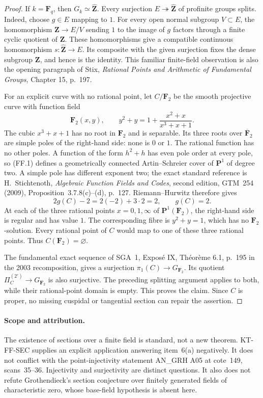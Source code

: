 \begin{proof}
If $k=\mathbf F_q$, then $G_k\simeq\widehat{\mathbf Z}$.
Every surjection $E\twoheadrightarrow\widehat{\mathbf Z}$ of
profinite groups splits. Indeed, choose $g\in E$ mapping to $1$.
For every open normal subgroup $V\subset E$, the homomorphism
$\mathbf Z\to E/V$ sending $1$ to the image of $g$ factors through
a finite cyclic quotient of $\mathbf Z$. These homomorphisms give
a compatible continuous homomorphism
$s:\widehat{\mathbf Z}\to E$. Its composite with the given
surjection fixes the dense subgroup $\mathbf Z$, and hence is the
identity. This familiar finite-field observation is also the opening
paragraph of Stix, \emph{Rational Points and Arithmetic of Fundamental
Groups}, Chapter 15, p.~197.

For an explicit curve with no rational point, let $C/\mathbf F_2$
be the smooth projective curve with function field
\[
 \mathbf F_2(x,y),\qquad
 y^2+y=1+\frac{x^2+x}{x^3+x+1}.                         \tag{FF.1}
\]
The cubic $x^3+x+1$ has no root in $\mathbf F_2$ and is separable.
Its three roots over $\overline{\mathbf F}_2$ are simple poles of
the right-hand side: none is $0$ or $1$. The rational function has
no other poles. A function of the form $h^2+h$ has even pole order
at every pole, so (FF.1) defines a geometrically connected
Artin--Schreier cover of $\mathbf P^1$ of degree two. A simple pole
has different exponent two; the exact standard reference is
H.~Stichtenoth, \emph{Algebraic Function Fields and Codes}, second
edition, GTM~254 (2009), Proposition~3.7.8(c)--(d), p.~127.
Riemann--Hurwitz therefore gives
\[
 2g(C)-2=2(-2)+3\cdot2=2,
 \qquad g(C)=2.
\]
At each of the three rational points $x=0,1,\infty$ of
$\mathbf P^1(\mathbf F_2)$, the right-hand side is regular and
has value $1$. The corresponding fibre is
$y^2+y=1$, which has no $\mathbf F_2$-solution. Every rational
point of $C$ would map to one of these three rational points.
Thus $C(\mathbf F_2)=\varnothing$.

The fundamental exact sequence of SGA~1, Expos\'e IX,
Th\'eor\`eme 6.1, p.~195 in the 2003 recomposition, gives a
surjection $\pi_1(C)\to G_{\mathbf F_2}$. Its quotient
$\Pi_C^{(2')}\to G_{\mathbf F_2}$ is also surjective. The
preceding splitting argument applies to both, while their
rational-point domain is empty. This proves the claim. Since
$C$ is proper, no missing cuspidal or tangential section can
repair the assertion.
\end{proof}

\paragraph{Scope and attribution.}
The existence of sections over a finite field is standard, not a
new theorem. KT-FF-SEC supplies an explicit application answering
item~6(a) negatively. It does not conflict with the point-injectivity
statement AN\_GRH A05 at cote~149, scans~35--36. Injectivity and
surjectivity are distinct questions. It also does not refute
Grothendieck's section conjecture over finitely generated fields of
characteristic zero, whose base-field hypothesis is absent here.

